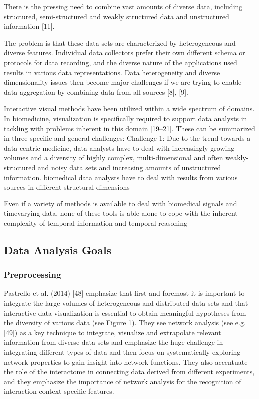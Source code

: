 \documentclass[10pt,a4paper]{article}
\begin{document}
	There is the pressing need to combine vast amounts of diverse data, including
	structured, semi-structured and weakly structured data and unstructured information
	[11]. \cite{Holzinger2014}
	
	The problem is that these data sets are characterized by heterogeneous and
	diverse features. Individual data collectors prefer their own different schema or
	protocols for data recording, and the diverse nature of the applications used results in
	various data representations. Data heterogeneity and diverse
	dimensionality issues then become major challenges if we are trying to enable data
	aggregation by combining data from all sources [8], [9]. \cite{Otasek2014}
	
	
	Interactive visual methods have been utilized within a wide spectrum of domains.
	In biomedicine, visualization is specifically required to support data analysts in
	tackling with problems inherent in this domain [19–21]. These can be summarized
	in three specific and general challenges:
	Challenge 1: Due to the trend towards a data-centric medicine, data analysts
	have to deal with increasingly growing volumes and a diversity of highly complex,
	multi-dimensional and often weakly-structured and noisy data sets and
	increasing amounts of unstructured information. biomedical data analysts have to deal with results from various sources in different
	structural dimensions \cite{Turkay2014}
	
	Even if a variety of methods is available to deal with biomedical signals and timevarying data, none of these tools is able alone to cope with the inherent complexity of temporal information and temporal reasoning\cite{bellazzi2011data}
	
	\subsection{Data Analysis Goals}
	
	\subsubsection{Preprocessing}
	
	Pastrello et al. (2014) [48] emphasize that first and foremost it is important to
	integrate the large volumes of heterogeneous and distributed data sets and that
	interactive data visualization is essential to obtain meaningful hypotheses from the
	diversity of various data (see Figure 1). They see network analysis (see e.g. [49]) as
	a key technique to integrate, visualize and extrapolate relevant information from
	diverse data sets and emphasize the huge challenge in integrating different types of
	data and then focus on systematically exploring network properties to gain insight
	into network functions. They also accentuate the role of the interactome in connecting
	data derived from different experiments, and they emphasize the importance of
	network analysis for the recognition of interaction context-specific features. \cite{Holzinger2014}
	
\end{document}
